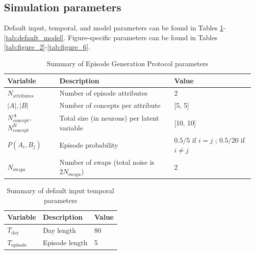 \documentclass{article}
\begin{document}
\subsection*{Simulation parameters}
Default input, temporal, and model parameters can be found in Tables \ref{tab:default_input}-\ref{tab:default_model}. Figure-specific parameters can be found in Tables \ref{tab:figure_2}-\ref{tab:figure_6}.
\begin{table}[ht]
\centering
\caption{Summary of Episode Generation Protocol parameters}
\label{tab:default_input}
\begin{tabular}{lll}
\toprule
\textbf{Variable} & \textbf{Description} & \textbf{Value} \\
\midrule
$N_\textrm{attributes}$ & Number of episode attributes & 2 \\
$|A|, |B| $ & Number of concepts per attribute & [5, 5] \\
$N_\textrm{concept}^A$, $N_\textrm{concept}^B$ & Total size (in neurons) per latent variable & [10, 10] \\
$P(A_i, B_j)$ & Episode probability & $0.5/5$ if $i = j$ ; $0.5/20$ if $i\neq j$ \\
$N_\textrm{swaps}$ & Number of swaps (total noise is $2N_\textrm{swaps}$) & 2 \\
\bottomrule
\end{tabular}
\end{table}
\begin{table}[ht]
\centering
\caption{Summary of default input temporal parameters}
\label{tab:default_time}
\begin{tabular}{lll}
\toprule
\textbf{Variable} & \textbf{Description} & \textbf{Value} \\
\midrule
$T_\textrm{day}$ & Day length & 80 \\
$T_\textrm{episode}$ & Episode length & 5 \\
\bottomrule
\end{tabular}
\end{table}
\end{document}
